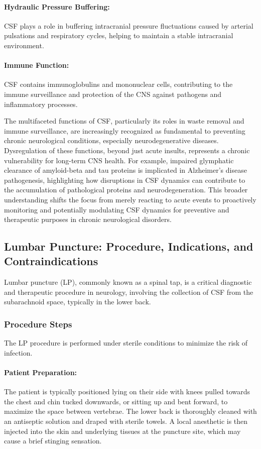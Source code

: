 \paragraph{Hydraulic Pressure Buffering:} CSF plays a role in buffering intracranial pressure fluctuations caused by arterial pulsations and respiratory cycles, helping to maintain a stable intracranial environment.
	
\paragraph{Immune Function:} CSF contains immunoglobulins and mononuclear cells, contributing to the immune surveillance and protection of the CNS against pathogens and inflammatory processes.
	
The multifaceted functions of CSF, particularly its roles in waste removal and immune surveillance, are increasingly recognized as fundamental to preventing chronic neurological conditions, especially neurodegenerative diseases. Dysregulation of these functions, beyond just acute insults, represents a chronic vulnerability for long-term CNS health. For example, impaired glymphatic clearance of amyloid-beta and tau proteins is implicated in Alzheimer's disease pathogenesis, highlighting how disruptions in CSF dynamics can contribute to the accumulation of pathological proteins and neurodegeneration. This broader understanding shifts the focus from merely reacting to acute events to proactively monitoring and potentially modulating CSF dynamics for preventive and therapeutic purposes in chronic neurological disorders.
	
\subsection{Lumbar Puncture: Procedure, Indications, and Contraindications}
	
Lumbar puncture (LP), commonly known as a spinal tap, is a critical diagnostic and therapeutic procedure in neurology, involving the collection of CSF from the subarachnoid space, typically in the lower back.
	
\subsubsection{Procedure Steps}
	
The LP procedure is performed under sterile conditions to minimize the risk of infection.
	
\paragraph{Patient Preparation:} The patient is typically positioned lying on their side with knees pulled towards the chest and chin tucked downwards, or sitting up and bent forward, to maximize the space between vertebrae. The lower back is thoroughly cleaned with an antiseptic solution and draped with sterile towels. A local anesthetic is then injected into the skin and underlying tissues at the puncture site, which may cause a brief stinging sensation.
	
